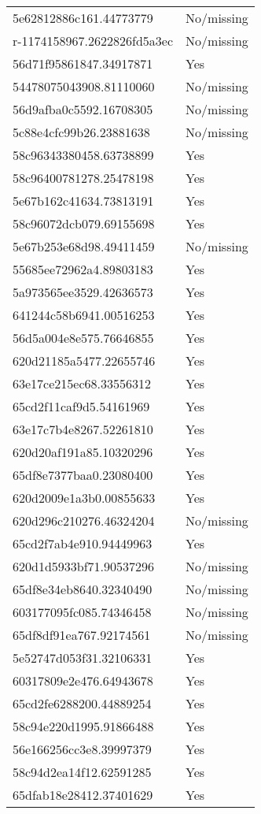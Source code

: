 \begin{tabular}{ll}
5e62812886c161.44773779 & No/missing \\
r-1174158967.2622826fd5a3ec & No/missing \\
56d71f95861847.34917871 & Yes \\
54478075043908.81110060 & No/missing \\
56d9afba0c5592.16708305 & No/missing \\
5c88e4cfc99b26.23881638 & No/missing \\
58c96343380458.63738899 & Yes \\
58c96400781278.25478198 & Yes \\
5e67b162c41634.73813191 & Yes \\
58c96072dcb079.69155698 & Yes \\
5e67b253e68d98.49411459 & No/missing \\
55685ee72962a4.89803183 & Yes \\
5a973565ee3529.42636573 & Yes \\
641244c58b6941.00516253 & Yes \\
56d5a004e8e575.76646855 & Yes \\
620d21185a5477.22655746 & Yes \\
63e17ce215ec68.33556312 & Yes \\
65cd2f11caf9d5.54161969 & Yes \\
63e17c7b4e8267.52261810 & Yes \\
620d20af191a85.10320296 & Yes \\
65df8e7377baa0.23080400 & Yes \\
620d2009e1a3b0.00855633 & Yes \\
620d296c210276.46324204 & No/missing \\
65cd2f7ab4e910.94449963 & Yes \\
620d1d5933bf71.90537296 & No/missing \\
65df8e34eb8640.32340490 & No/missing \\
603177095fc085.74346458 & No/missing \\
65df8df91ea767.92174561 & No/missing \\
5e52747d053f31.32106331 & Yes \\
60317809e2e476.64943678 & Yes \\
65cd2fe6288200.44889254 & Yes \\
58c94e220d1995.91866488 & Yes \\
56e166256cc3e8.39997379 & Yes \\
58c94d2ea14f12.62591285 & Yes \\
65dfab18e28412.37401629 & Yes \\

\end{tabular}
